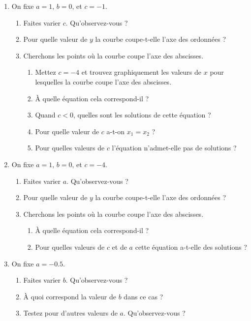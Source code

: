 \documentclass{article}
\begin{document}
\begin{enumerate}
    \item On fixe $a = 1$, $b = 0$, et $c = -1$.
    \begin{enumerate}
        \item Faites varier $c$. Qu'observez-vous ?
        \item Pour quelle valeur de $y$ la courbe coupe-t-elle l'axe des ordonnées ?
        \item Cherchons les points où la courbe coupe l'axe des abscisses.
        \begin{enumerate}
            \item Mettez $c = -4$ et trouvez graphiquement les valeurs de $x$ pour lesquelles la courbe coupe l'axe des abscisses.
            \item À quelle équation cela correspond-il ?
            \item Quand $c < 0$, quelles sont les solutions de cette équation ?
            \item Pour quelle valeur de $c$ a-t-on $x_1 = x_2$ ?
            \item Pour quelles valeurs de $c$ l'équation n'admet-elle pas de solutions ?
        \end{enumerate}
    \end{enumerate}

    \item On fixe $a = 1$, $b = 0$, et $c = -4$.
    \begin{enumerate}
        \item Faites varier $a$. Qu'observez-vous ?
        \item Pour quelle valeur de $y$ la courbe coupe-t-elle l'axe des ordonnées ?
        \item Cherchons les points où la courbe coupe l'axe des abscisses.
        \begin{enumerate}
            \item À quelle équation cela correspond-il ?
            \item Pour quelles valeurs de $c$ et de $a$ cette équation a-t-elle des solutions ?
        \end{enumerate}
    \end{enumerate}

    \item On fixe $a = -0.5$.
    \begin{enumerate}
        \item Faites varier $b$. Qu'observez-vous ?
        \item À quoi correspond la valeur de $b$ dans ce cas ?
        \item Testez pour d'autres valeurs de $a$. Qu'observez-vous ?
    \end{enumerate}


\end{enumerate}
\end{document}
